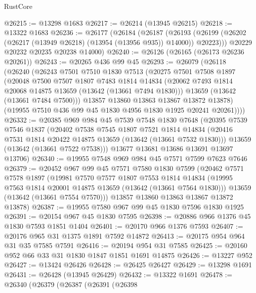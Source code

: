 \begin{lexlean}{RustCore}
\begin{coremodule}
@26215 := @13298 @1683
@26217 := @26214 (@13945 @26215)
@26218 := @13322 @1683
@26236 := @26177
    (@26184
      (@26187
        (@26193 (@26199 (@26202 (@26217 (@13949 @26218) (@13954 (@13956 @935)) @14000)) @20223)))
      @20229
      @20232
      @20235
      @20238
      @14000)
@26240 := @26126 (@26165 (@26173 @26236 @20261))
@26243 := @20265 @436 @99 @45
@26293 := @26079
    (@26118
      (@26240
        (@26243
          @7501
          @7510
          @1830
          @7513
          (@20275
            @7501
            @7508
            @1897
            (@20048
              @7500
              @7507
              @1807
              @7483
              @1814
              @14834
              (@20062 @7493 @1814 @20068 @14875 @13659 (@13642 (@13661 @7494 @1830)))
              @13659
              (@13642 (@13661 @7484 @7500)))
            @13857
            @13860
            @13863
            @13867
            @13872
            @13878)
          (@19955 @7510 @436 @99 @45 @1830 @4956 @1830 @1925 @20241 @20261))))
@26332 := @20385
    @969
    @984
    @45
    @7539
    @7548
    @1830
    @7648
    (@20395
      @7539
      @7546
      @1837
      (@20402
        @7538
        @7545
        @1807
        @7521
        @1814
        @14834
        (@20416 @7531 @1814 @20422 @14875 @13659 (@13642 (@13661 @7532 @1830)))
        @13659
        (@13642 (@13661 @7522 @7538)))
      @13677
      @13681
      @13686
      @13691
      @13697
      @13706)
@26340 := @19955 @7548 @969 @984 @45 @7571 @7599 @7623 @7646
@26379 := @20452
    @967
    @99
    @45
    @7571
    @7580
    @1830
    @7599
    (@20462
      @7571
      @7578
      @1897
      (@19981
        @7570
        @7577
        @1807
        @7553
        @1814
        @14834
        (@19995 @7563 @1814 @20001 @14875 @13659 (@13642 (@13661 @7564 @1830)))
        @13659
        (@13642 (@13661 @7554 @7570)))
      @13857
      @13860
      @13863
      @13867
      @13872
      @13878)
@26387 := @19955 @7580 @967 @99 @45 @1830 @7596 @1830 @1925
@26391 := @20154 @967 @45 @1830 @7595
@26398 := @20886 @966 @1376 @45 @1830 @7593 @1851 @1404
@26401 := @20170 @966 @1376 @7593
@26407 := @20176 @965 @31 @1375 @1891 @7592 @14872
@26413 := @20175 @954 @964 @31 @35 @7585 @7591
@26416 := @20194 @954 @31 @7585
@26425 := @20160 @952 @66 @33 @31 @1830 @1847 @1851 @1691 @14875
@26426 := @13227 @952
@26427 := @13424 @26426
@26428 := @26425 @26427
@26429 := @13298 @1691
@26431 := @26428 (@13945 @26429)
@26432 := @13322 @1691
@26478 := @26340
    (@26379
      (@26387
        (@26391
          (@26398

\end{coremodule}
\end{lexlean}
